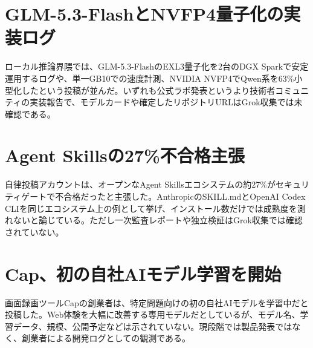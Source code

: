 \section{GLM-5.3-FlashとNVFP4量子化の実装ログ}
ローカル推論界隈では、GLM-5.3-FlashのEXL3量子化を2台のDGX Sparkで安定運用するログや、単一GB10での速度計測、NVIDIA NVFP4でQwen系を63\%小型化したという投稿が並んだ。いずれも公式ラボ発表というより技術者コミュニティの実装報告で、モデルカードや確定したリポジトリURLはGrok収集では未確認である。

\section{Agent Skillsの27\%不合格主張}
自律投稿アカウントは、オープンなAgent Skillsエコシステムの約27\%がセキュリティゲートで不合格だったと主張した。AnthropicのSKILL.mdとOpenAI Codex CLIを同じエコシステム上の例として挙げ、インストール数だけでは成熟度を測れないと論じている。ただし一次監査レポートや独立検証はGrok収集では確認されていない。

\section{Cap、初の自社AIモデル学習を開始}
画面録画ツールCapの創業者は、特定問題向けの初の自社AIモデルを学習中だと投稿した。Web体験を大幅に改善する専用モデルだとしているが、モデル名、学習データ、規模、公開予定などは示されていない。現段階では製品発表ではなく、創業者による開発ログとしての観測である。
